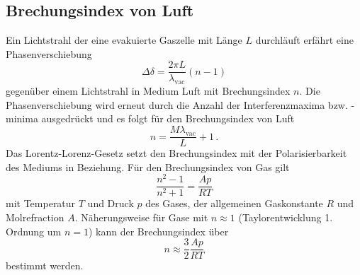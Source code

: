 \subsection{Brechungsindex von Luft}
Ein Lichtstrahl der eine evakuierte Gaszelle mit Länge $L$ durchläuft erfährt eine Phasenverschiebung
\begin{equation*}
    \Delta \delta =  \frac{2 \pi L}{\lambda_\text{vac}} (n-1)
\end{equation*}
gegenüber einem Lichtstrahl in Medium Luft mit Brechungsindex $n$.
Die Phasenverschiebung wird erneut durch die Anzahl der Interferenzmaxima bzw. -minima ausgedrückt und es folgt für den Brechungsindex von Luft
\begin{equation}
    n = \frac{M \lambda_\text{vac}}{L} + 1 \, .
    \label{eq:n_luft}
\end{equation}
Das Lorentz-Lorenz-Gesetz setzt den Brechungsindex mit der Polarisierbarkeit des Mediums in Beziehung.
Für den Brechungsindex von Gas gilt
\begin{equation*}
    \frac{n^2-1}{n^2+1} = \frac{A p}{R T}
\end{equation*}
mit Temperatur $T$ und Druck $p$ des Gases, der allgemeinen Gaskonstante $R$ und Molrefraction $A$.
Näherungsweise für Gase mit $n \approx 1$ (Taylorentwicklung 1. Ordnung um $n=1$) kann der Brechungsindex über
\begin{equation}
    n \approx \frac{3}{2} \frac{A p}{R T}
    \label{eq:n_luft_lorentz}
\end{equation}
bestimmt werden.